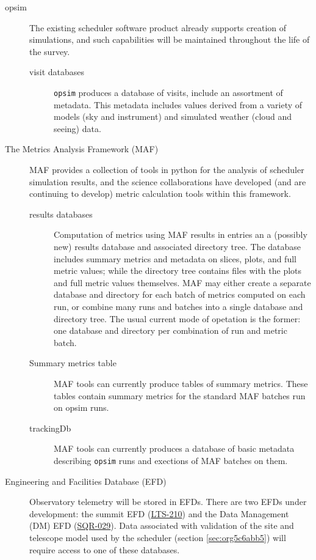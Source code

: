 \begin{description}
\item[{opsim}] The existing scheduler software product already supports creation of simulations, and such capabilities will be maintained throughout the life of the survey.
\begin{description}
\item[{visit databases}] \texttt{opsim} produces a database of visits, include an assortment of metadata. This metadata includes values derived from a variety of models (sky and instrument) and simulated weather (cloud and seeing) data.
\end{description}
\item[{The Metrics Analysis Framework (MAF)}] MAF provides a collection of tools in python for the analysis of scheduler simulation results, and the science collaborations have developed (and are continuing to develop) metric calculation tools within this framework. 
\begin{description}
\item[{results databases}] Computation of metrics using MAF results in entries an a (possibly new) results database and associated directory tree. The database includes summary metrics and metadata on slices, plots, and full metric values; while the directory tree contains files with the plots and full metric values themselves. MAF may either create a separate database and directory for each batch of metrics computed on each run, or combine many runs and batches into a single database and directory tree. The usual current mode of opetation is the former: one database and directory per combination of run and metric batch.
\item[{Summary metrics table}] MAF tools can currently produce tables of summary metrics. These tables contain summary metrics for the standard MAF batches run on opsim runs.
\item[{trackingDb}] MAF tools can currently produces a database of basic metadata describing \texttt{opsim} runs and exections of MAF batches on them.
\end{description}
\item[{Engineering and Facilities Database (EFD)}] Observatory telemetry will be stored in EFDs. There are two EFDs under development: the summit EFD (\href{https://ls.st/LTS-210}{LTS-210}) and the Data Management (DM) EFD (\href{https://sqr-029.lsst.io/}{SQR-029}).  Data associated with validation of the site and telescope model used by the scheduler (section \ref{sec:org5c6abb5}) will require access to one of these databases.

\end{description}
